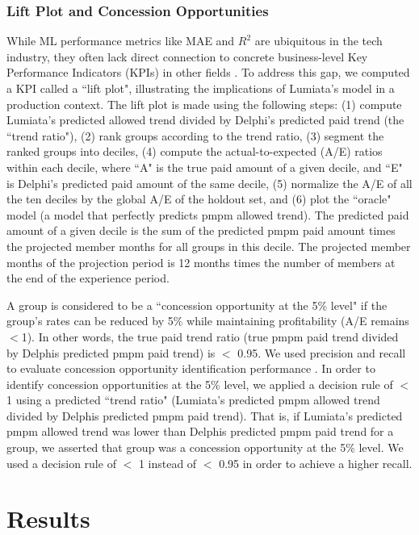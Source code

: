 \documentclass[letterpaper]{article}
\begin{document}
\subsubsection{Lift Plot and Concession Opportunities}
While ML performance metrics like MAE and $R^{2}$ are ubiquitous in the tech industry, they often lack direct connection to concrete business-level Key Performance Indicators (KPIs) in other fields \cite{AnaTransl}. To address this gap, we computed a KPI called a ``lift plot", illustrating the implications of Lumiata's model in a production context. The lift plot is made using the following steps: (1) compute Lumiata's predicted allowed trend divided by Delphi's predicted paid trend (the ``trend ratio"),
(2) rank groups according to the trend ratio,
(3) segment the ranked groups into deciles,
(4) compute the actual-to-expected (A/E) ratios within each decile, where ``A" is the true paid amount of a given decile, and ``E" is Delphi's predicted paid amount of the same decile,
(5) normalize the A/E of all the ten deciles by the global A/E of the holdout set, and
(6) plot the ``oracle" model (a model that perfectly predicts pmpm allowed trend).
The predicted paid amount of a given decile is the sum of the predicted pmpm paid amount times the projected member months for all groups in this decile.  The projected member months of the projection period is 12 months times the number of members at the end of the experience period.

A group is considered to be a ``concession opportunity at the 5\% level" if the group's rates can be reduced by 5\% while maintaining profitability (A/E remains $<$1). In other words, the true paid trend ratio (true pmpm paid trend divided by Delphis predicted pmpm paid trend) is $<$ 0.95.  We used precision and recall to evaluate concession opportunity identification performance \cite{PrecRecall}. In order to identify concession opportunities at the 5\% level, we applied a decision rule of $<$ 1 using a predicted ``trend ratio" (Lumiata's predicted pmpm allowed trend divided by Delphis predicted pmpm paid trend). That is, if Lumiata's predicted pmpm allowed trend was lower than Delphis predicted pmpm paid trend for a group, we asserted that group was a concession opportunity at the 5\% level. We used a decision rule of $<$ 1 instead of $<$ 0.95 in order to achieve a higher recall.






\section*{Results}
\end{document}
